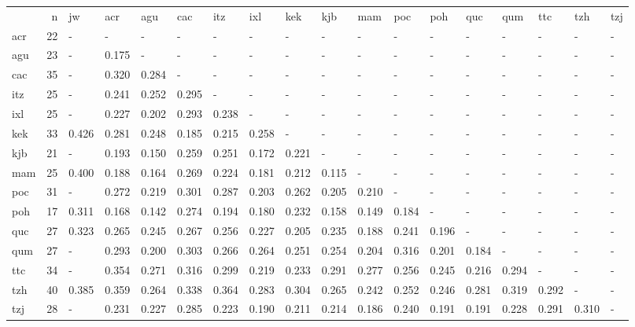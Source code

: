 \begin{tabular}{lrllllllllllllllll}
 & n & jw & acr & agu & cac & itz & ixl & kek & kjb & mam & poc & poh & quc & qum & ttc & tzh & tzj \\
acr & 22 & - & - & - & - & - & - & - & - & - & - & - & - & - & - & - & - \\
agu & 23 & - & 0.175 & - & - & - & - & - & - & - & - & - & - & - & - & - & - \\
cac & 35 & - & 0.320 & 0.284 & - & - & - & - & - & - & - & - & - & - & - & - & - \\
itz & 25 & - & 0.241 & 0.252 & 0.295 & - & - & - & - & - & - & - & - & - & - & - & - \\
ixl & 25 & - & 0.227 & 0.202 & 0.293 & 0.238 & - & - & - & - & - & - & - & - & - & - & - \\
kek & 33 & 0.426 & 0.281 & 0.248 & 0.185 & 0.215 & 0.258 & - & - & - & - & - & - & - & - & - & - \\
kjb & 21 & - & 0.193 & 0.150 & 0.259 & 0.251 & 0.172 & 0.221 & - & - & - & - & - & - & - & - & - \\
mam & 25 & 0.400 & 0.188 & 0.164 & 0.269 & 0.224 & 0.181 & 0.212 & 0.115 & - & - & - & - & - & - & - & - \\
poc & 31 & - & 0.272 & 0.219 & 0.301 & 0.287 & 0.203 & 0.262 & 0.205 & 0.210 & - & - & - & - & - & - & - \\
poh & 17 & 0.311 & 0.168 & 0.142 & 0.274 & 0.194 & 0.180 & 0.232 & 0.158 & 0.149 & 0.184 & - & - & - & - & - & - \\
quc & 27 & 0.323 & 0.265 & 0.245 & 0.267 & 0.256 & 0.227 & 0.205 & 0.235 & 0.188 & 0.241 & 0.196 & - & - & - & - & - \\
qum & 27 & - & 0.293 & 0.200 & 0.303 & 0.266 & 0.264 & 0.251 & 0.254 & 0.204 & 0.316 & 0.201 & 0.184 & - & - & - & - \\
ttc & 34 & - & 0.354 & 0.271 & 0.316 & 0.299 & 0.219 & 0.233 & 0.291 & 0.277 & 0.256 & 0.245 & 0.216 & 0.294 & - & - & - \\
tzh & 40 & 0.385 & 0.359 & 0.264 & 0.338 & 0.364 & 0.283 & 0.304 & 0.265 & 0.242 & 0.252 & 0.246 & 0.281 & 0.319 & 0.292 & - & - \\
tzj & 28 & - & 0.231 & 0.227 & 0.285 & 0.223 & 0.190 & 0.211 & 0.214 & 0.186 & 0.240 & 0.191 & 0.191 & 0.228 & 0.291 & 0.310 & - \\
\end{tabular}

